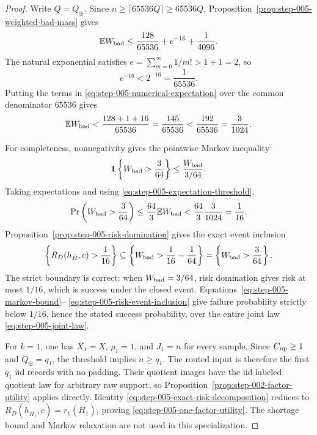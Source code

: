 \begin{proof}
Write \(Q=Q_\oplus\).  Since
\(n\ge\lceil65536Q\rceil\ge65536Q\),
Proposition~\ref{prop:step-005-weighted-bad-mass} gives
\begin{equation}\label{eq:step-005-numerical-expectation}
\mathbb EW_{\rm bad}
\le\frac{128}{65536}+e^{-16}+\frac1{4096}.
\end{equation}
The natural exponential satisfies
\(e=\sum_{m=0}^\infty1/m!>1+1=2\), so
\begin{equation}\label{eq:step-005-exp-comparison}
e^{-16}<2^{-16}=\frac1{65536}.
\end{equation}
Putting the terms in \eqref{eq:step-005-numerical-expectation} over the
common denominator \(65536\) gives
\begin{equation}\label{eq:step-005-expectation-threshold}
\mathbb EW_{\rm bad}
<\frac{128+1+16}{65536}
=\frac{145}{65536}
<\frac{192}{65536}
=\frac3{1024}.
\end{equation}

For completeness, nonnegativity gives the pointwise Markov inequality
\begin{equation}\label{eq:step-005-markov-indicator}
\mathbf1\left\{W_{\rm bad}>\frac3{64}\right\}
\le\frac{W_{\rm bad}}{3/64}.
\end{equation}
Taking expectations and using
\eqref{eq:step-005-expectation-threshold},
\begin{equation}\label{eq:step-005-markov-bound}
\Pr\left(W_{\rm bad}>\frac3{64}\right)
\le\frac{64}{3}\mathbb EW_{\rm bad}
<\frac{64}{3}\frac3{1024}=\frac1{16}.
\end{equation}
Proposition~\ref{prop:step-005-risk-domination} gives the exact event
inclusion
\begin{equation}\label{eq:step-005-risk-event-inclusion}
\left\{R_D(h_{\bar H},c)>\frac1{16}\right\}
\subseteq
\left\{W_{\rm bad}>\frac1{16}-\frac1{64}\right\}
=\left\{W_{\rm bad}>\frac3{64}\right\}.
\end{equation}
The strict boundary is correct: when \(W_{\rm bad}=3/64\), risk domination
gives risk at most \(1/16\), which is success under the closed event.
Equations~\eqref{eq:step-005-markov-bound}--
\eqref{eq:step-005-risk-event-inclusion} give failure probability strictly
below \(1/16\), hence the stated success probability, over the entire joint
law \eqref{eq:step-005-joint-law}.

For \(k=1\), one has \(X_1=X\), \(\rho_1=1\), and \(J_1=n\) for every
sample.  Since \(C_{\rm up}\ge1\) and \(Q_\oplus=q_1\), the threshold
implies \(n\ge q_1\).  The routed input is therefore the first \(q_1\)
iid records with no padding.  Their quotient images have the iid labeled
quotient law for arbitrary raw support, so
Proposition~\ref{prop:step-002-factor-utility} applies directly.  Identity
\eqref{eq:step-005-exact-risk-decomposition} reduces to
\(R_D(h_{\bar H_1},c)=r_1(\bar H_1)\), proving
\eqref{eq:step-005-one-factor-utility}.  The shortage bound and Markov
relaxation are not used in this specialization.
\end{proof}

